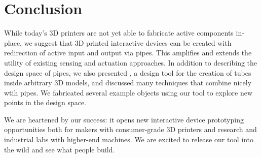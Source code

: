 \section{Conclusion}

While today's 3D printers are not yet able to fabricate active components in-place, we suggest that 3D printed interactive devices can be created with redirection of active input and output via pipes.  This amplifies and extends the utility of existing sensing and actuation approaches.  In addition to describing the design space of pipes, we also presented \systemname, a design tool for the creation of tubes inside arbitrary 3D models, and discussed many techniques that combine nicely wtih pipes.  We fabricated several example objects using our tool to explore new points in the design space.

We are heartened by our success: it opens new interactive device prototyping opportunities both for makers with consumer-grade 3D printers and research and industrial labs with higher-end machines.  We are excited to release our tool into the wild and see what people build.